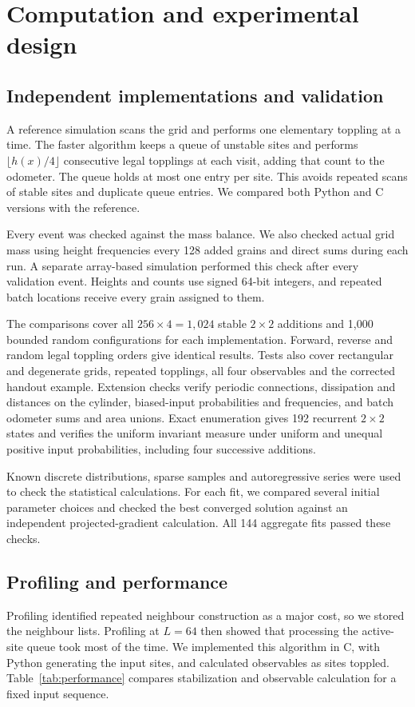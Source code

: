 \chapter{Computation and experimental design}\label{sec:methods}
\section{Independent implementations and validation}\label{sec:validation}
A reference simulation scans the grid and performs one elementary toppling at a time. The faster algorithm keeps a queue of unstable sites and performs $\lfloor h(x)/4\rfloor$ consecutive legal topplings at each visit, adding that count to the odometer. The queue holds at most one entry per site. This avoids repeated scans of stable sites and duplicate queue entries. We compared both Python and C versions with the reference.

Every event was checked against the mass balance. We also checked actual grid mass using height frequencies every 128 added grains and direct sums during each run. A separate array-based simulation performed this check after every validation event. Heights and counts use signed 64-bit integers, and repeated batch locations receive every grain assigned to them.

The comparisons cover all $256\times4=1,024$ stable $2\times2$ additions and 1,000 bounded random configurations for each implementation. Forward, reverse and random legal toppling orders give identical results. Tests also cover rectangular and degenerate grids, repeated topplings, all four observables and the corrected handout example. Extension checks verify periodic connections, dissipation and distances on the cylinder, biased-input probabilities and frequencies, and batch odometer sums and area unions. Exact enumeration gives 192 recurrent $2\times2$ states and verifies the uniform invariant measure under uniform and unequal positive input probabilities, including four successive additions.

Known discrete distributions, sparse samples and autoregressive series were used to check the statistical calculations. For each fit, we compared several initial parameter choices and checked the best converged solution against an independent projected-gradient calculation. All 144 aggregate fits passed these checks.

\section{Profiling and performance}\label{sec:performance}
Profiling identified repeated neighbour construction as a major cost, so we stored the neighbour lists. Profiling at $L=64$ then showed that processing the active-site queue took most of the time. We implemented this algorithm in C, with Python generating the input sites, and calculated observables as sites toppled. Table~\ref{tab:performance} compares stabilization and observable calculation for a fixed input sequence.


